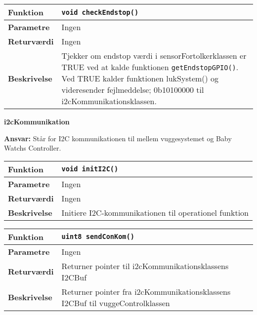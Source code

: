 \begin{center}
    \begin{tabular}{ | l | p{} |}
    \hline
    \textbf{Funktion}	& \verb+void checkEndstop() +						\\ \hline
    \textbf{Parametre} 	& Ingen		\\ \hline
    \textbf{Returværdi}	& Ingen 								\\ \hline
    \textbf{Beskrivelse}	& Tjekker om endstop værdi i sensorFortolkerklassen er TRUE ved at kalde funktionen \verb+getEndstopGPIO()+. Ved TRUE kalder funktionen lukSystem() og videresender fejlmeddelse; 0b10100000 til i2cKommunikationsklassen.		\\ \hline
    \end{tabular}
\end{center}


{\centering
\textbf{i2cKommunikation}\par
}
\textbf{Ansvar:} Står for I2C kommunikationen til mellem vuggesystemet og Baby Watchs Controller. \

\begin{center}
    \begin{tabular}{ | l | p{} |}
    \hline
    \textbf{Funktion}	& \verb+void initI2C() +									\\ \hline
    \textbf{Parametre} 	& Ingen														\\ \hline
    \textbf{Returværdi}	& Ingen 													\\ \hline
    \textbf{Beskrivelse}	& Initiere I2C-kommunikationen til operationel funktion	\\ \hline
    \end{tabular}
\end{center}

\begin{center}
    \begin{tabular}{ | l | p{} |}
    \hline
    \textbf{Funktion}	& \verb+uint8 sendConKom() +								\\ \hline
    \textbf{Parametre} 	& Ingen														\\ \hline
    \textbf{Returværdi}	& Returner pointer til i2cKommunikationsklassens I2CBuf											\\ \hline
    \textbf{Beskrivelse}	& Returner pointer fra i2cKommunikationsklassens I2CBuf til vuggeControlklassen	\\ \hline
    \end{tabular}
\end{center}

